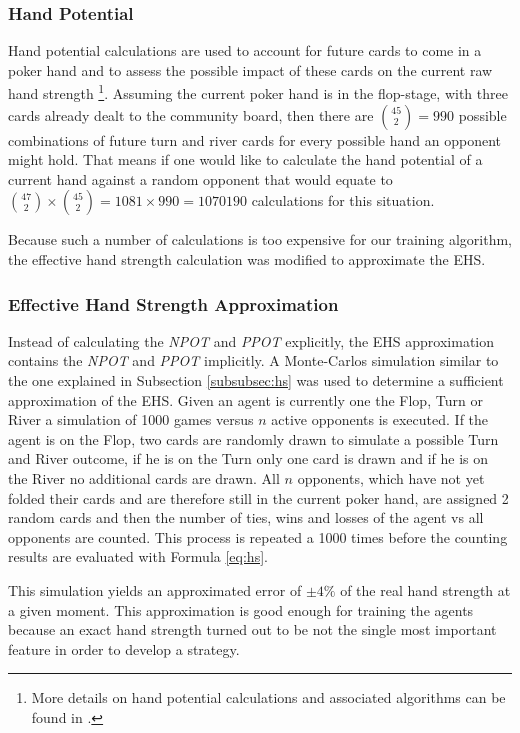 \subsubsection{Hand Potential}
\label{subsubsec:hp}
Hand potential calculations are used to account for future cards to come in a poker hand and to assess the possible impact of these cards on the current raw hand strength \cite{challenge_of_poker}\footnote{More details on hand potential calculations and associated algorithms can be found in \cite[p. 216-218]{challenge_of_poker}.}.  
Assuming the current poker hand is in the flop-stage, with three cards already dealt to the community board, then there are ${45\choose 2} = 990$ possible combinations of future turn and river cards for every possible hand an opponent might hold. That means if one would like to calculate the hand potential of a current hand against a random opponent that would equate to ${47\choose 2} \times {45\choose 2} = 1081 \times 990 = 1070190$ calculations for this situation. \par
Because such a number of calculations is too expensive for our training algorithm, the effective hand strength calculation was modified to approximate the EHS.
\subsubsection{Effective Hand Strength Approximation}
Instead of calculating the \textit{NPOT} and \textit{PPOT} explicitly, the EHS approximation contains the \textit{NPOT} and \textit{PPOT} implicitly. A Monte-Carlos simulation similar to the one explained in Subsection \ref{subsubsec:hs} was used to determine a sufficient approximation of the EHS. Given an agent is currently one the Flop, Turn or River a simulation of 1000 games versus $n$ active opponents is executed. If the agent is on the Flop, two cards are randomly drawn to simulate a possible Turn and River outcome, if he is on the Turn only one card is drawn and if he is on the River no additional cards are drawn. All $n$ opponents, which have not yet folded their cards and are therefore still in the current poker hand, are assigned 2 random cards and then the number of ties, wins and losses of the agent vs all opponents are counted. This process is repeated a 1000 times before the counting results are evaluated with Formula \ref{eq:hs}.\par
This simulation yields an approximated error of $\pm4\%$ of the real hand strength at a given moment. This approximation is good enough for training the agents because an exact hand strength turned out to be not the single most important feature in order to develop a strategy.  
\pagebreak
